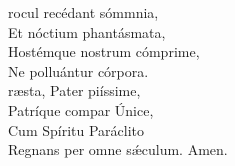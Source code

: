 \vspace{0.5cm}

\begin{center}
\end{center}


\def\greinitialformat#1{{\fontsize{40}{40}\selectfont #1}}
\setaboveinitialseparation{0.72mm}



\vspace{0.5cm}

\begin{multicols}{2}
\noindent{}rocul recédant sómmnia,\\
Et nóctium phantásmata,\\
Hostémque nostrum cómprime,\\
Ne polluántur córpora.\\

\noindent{}ræsta, Pater piíssime,\\
Patríque compar Únice,\\
Cum Spíritu Paráclito\\
Regnans per omne s\'{æ}culum. Amen.

\end{multicols}
